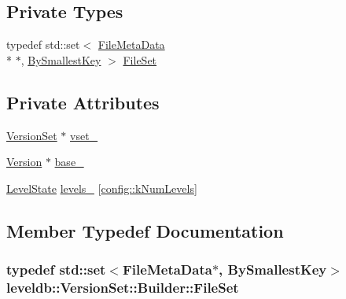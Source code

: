 \subsection*{Private Types}
\begin{DoxyCompactItemize}
\item 
typedef std\-::set$<$ \hyperlink{structleveldb_1_1_file_meta_data}{File\-Meta\-Data} \\*
$\ast$, \hyperlink{structleveldb_1_1_version_set_1_1_builder_1_1_by_smallest_key}{By\-Smallest\-Key} $>$ \hyperlink{classleveldb_1_1_version_set_1_1_builder_add38ea04d208ebaa9b486597c7b6246a}{File\-Set}
\end{DoxyCompactItemize}
\subsection*{Private Attributes}
\begin{DoxyCompactItemize}
\item 
\hyperlink{classleveldb_1_1_version_set}{Version\-Set} $\ast$ \hyperlink{classleveldb_1_1_version_set_1_1_builder_a96967ae813b41ac070e8a9ea3df0dd7c}{vset\-\_\-}
\item 
\hyperlink{classleveldb_1_1_version}{Version} $\ast$ \hyperlink{classleveldb_1_1_version_set_1_1_builder_a473a78b62dff568cb0304aa914c8a1d8}{base\-\_\-}
\item 
\hyperlink{structleveldb_1_1_version_set_1_1_builder_1_1_level_state}{Level\-State} \hyperlink{classleveldb_1_1_version_set_1_1_builder_ad11ed07449801fd19dd721b7b710d067}{levels\-\_\-} \mbox{[}\hyperlink{namespaceleveldb_1_1config_ab6017947ae68898c606643bddc0f5b9c}{config\-::k\-Num\-Levels}\mbox{]}
\end{DoxyCompactItemize}


\subsection{Member Typedef Documentation}
\hypertarget{classleveldb_1_1_version_set_1_1_builder_add38ea04d208ebaa9b486597c7b6246a}{
\subsubsection[{File\-Set}]{\setlength{\rightskip}{0pt plus 5cm}typedef std\-::set$<${\bf File\-Meta\-Data}$\ast$, {\bf By\-Smallest\-Key}$>$ {\bf leveldb\-::\-Version\-Set\-::\-Builder\-::\-File\-Set}\hspace{0.3cm}{\ttfamily [private]}}}\label{classleveldb_1_1_version_set_1_1_builder_add38ea04d208ebaa9b486597c7b6246a}


